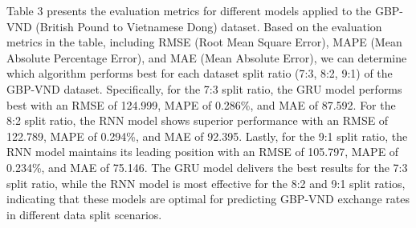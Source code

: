 \documentclass{ieeeojies}
\begin{document}
Table 3 presents the evaluation metrics for different models applied to the GBP-VND (British Pound to Vietnamese Dong) dataset. Based on the evaluation metrics in the table, including RMSE (Root Mean Square Error), MAPE (Mean Absolute Percentage Error), and MAE (Mean Absolute Error), we can determine which algorithm performs best for each dataset split ratio (7:3, 8:2, 9:1) of the GBP-VND dataset. Specifically, for the 7:3 split ratio, the GRU model performs best with an RMSE of 124.999, MAPE of 0.286\%, and MAE of 87.592. For the 8:2 split ratio, the RNN model shows superior performance with an RMSE of 122.789, MAPE of 0.294\%, and MAE of 92.395. Lastly, for the 9:1 split ratio, the RNN model maintains its leading position with an RMSE of 105.797, MAPE of 0.234\%, and MAE of 75.146. The GRU model delivers the best results for the 7:3 split ratio, while the RNN model is most effective for the 8:2 and 9:1 split ratios, indicating that these models are optimal for predicting GBP-VND exchange rates in different data split scenarios.
\end{document}
